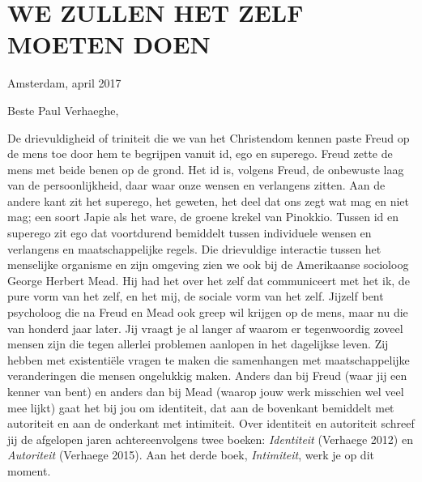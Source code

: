\documentclass[]{book}
\begin{document}
\hypertarget{we-zullen-het-zelf-moeten-doen}{%
\chapter*{WE ZULLEN HET ZELF MOETEN
DOEN}\label{we-zullen-het-zelf-moeten-doen}}

Amsterdam, april 2017

Beste Paul Verhaeghe,

De drievuldigheid of triniteit die we van het Christendom kennen paste
Freud op de mens toe door hem te begrijpen vanuit id, ego en superego.
Freud zette de mens met beide benen op de grond. Het id is, volgens
Freud, de onbewuste laag van de persoonlijkheid, daar waar onze wensen
en verlangens zitten. Aan de andere kant zit het superego, het geweten,
het deel dat ons zegt wat mag en niet mag; een soort Japie als het ware,
de groene krekel van Pinokkio. Tussen id en superego zit ego dat
voortdurend bemiddelt tussen individuele wensen en verlangens en
maatschappelijke regels. Die drievuldige interactie tussen het
menselijke organisme en zijn omgeving zien we ook bij de Amerikaanse
socioloog George Herbert Mead. Hij had het over het zelf dat
communiceert met het ik, de pure vorm van het zelf, en het mij, de
sociale vorm van het zelf. Jijzelf bent psycholoog die na Freud en Mead
ook greep wil krijgen op de mens, maar nu die van honderd jaar later.
Jij vraagt je al langer af waarom er tegenwoordig zoveel mensen zijn die
tegen allerlei problemen aanlopen in het dagelijkse leven. Zij hebben
met existentiële vragen te maken die samenhangen met maatschappelijke
veranderingen die mensen ongelukkig maken. Anders dan bij Freud (waar
jij een kenner van bent) en anders dan bij Mead (waarop jouw werk
misschien wel veel mee lijkt) gaat het bij jou om identiteit, dat aan de
bovenkant bemiddelt met autoriteit en aan de onderkant met intimiteit.
Over identiteit en autoriteit schreef jij de afgelopen jaren
achtereenvolgens twee boeken: \emph{Identiteit} (Verhaege 2012) en
\emph{Autoriteit} (Verhaege 2015). Aan het derde boek,
\emph{Intimiteit}, werk je op dit moment.
\end{document}
